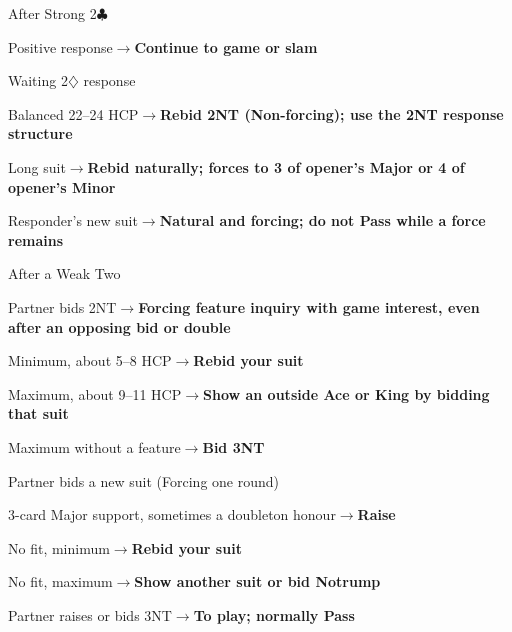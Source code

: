\documentclass[10pt,letterpaper]{article}
\newcommand{\C}{\ensuremath{\clubsuit}}
\newcommand{\D}{\ensuremath{\diamondsuit}}
\begin{document}
\begin{minipage}[t]{0.485\textwidth}\vspace{0pt}

\begin{guidecard}{After Strong 2\C{}}
\begin{branches}
\item Positive response\;\ensuremath{\longrightarrow}\;\textbf{Continue to game or slam}
\item Waiting 2\D{} response
\begin{branches}
\item Balanced 22--24 HCP\;\ensuremath{\longrightarrow}\;\textbf{Rebid 2NT (Non-forcing); use the 2NT response structure}
\item Long suit\;\ensuremath{\longrightarrow}\;\textbf{Rebid naturally; forces to 3 of opener's Major or 4 of opener's Minor}
\end{branches}
\item Responder's new suit\;\ensuremath{\longrightarrow}\;\textbf{Natural and forcing; do not Pass while a force remains}
\end{branches}
\end{guidecard}

\begin{guidecard}{After a Weak Two}
\begin{branches}
\item Partner bids 2NT\;\ensuremath{\longrightarrow}\;\textbf{Forcing feature inquiry with game interest, even after an opposing bid or double}
\begin{branches}
\item Minimum, about 5--8 HCP\;\ensuremath{\longrightarrow}\;\textbf{Rebid your suit}
\item Maximum, about 9--11 HCP\;\ensuremath{\longrightarrow}\;\textbf{Show an outside Ace or King by bidding that suit}
\item Maximum without a feature\;\ensuremath{\longrightarrow}\;\textbf{Bid 3NT}
\end{branches}
\item Partner bids a new suit (Forcing one round)
\begin{branches}
\item 3-card Major support, sometimes a doubleton honour\;\ensuremath{\longrightarrow}\;\textbf{Raise}
\item No fit, minimum\;\ensuremath{\longrightarrow}\;\textbf{Rebid your suit}
\item No fit, maximum\;\ensuremath{\longrightarrow}\;\textbf{Show another suit or bid Notrump}
\end{branches}
\item Partner raises or bids 3NT\;\ensuremath{\longrightarrow}\;\textbf{To play; normally Pass}
\end{branches}
\end{guidecard}

\end{minipage}
\end{document}
